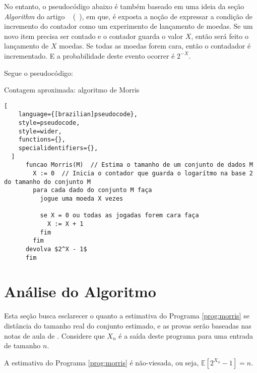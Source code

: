 No entanto, o pseudocódigo abaixo é também baseado em uma ideia da seção \textit{Algorithm} do artigo ~ (~\cite{ApproximateCountingAlgorithm}), 
em que, é exposta a noção de expressar a condição de incremento do contador como um experimento de lançamento de moedas. 
Se um novo item precisa ser contado e o contador guarda o valor $X$, então será feito o lançamento de $X$ moedas. Se todas as moedas forem cara, então o contadador é incrementado.
E a probabilidade deste evento ocorrer é $2^{-X}$. 

Segue o pseudocódigo:
\begin{programruledcaption}{Contagem aproximada: algoritmo de Morris\label{prog:morris}}
  \begin{lstlisting}[
    language={[brazilian]pseudocode},
    style=pseudocode,
    style=wider,
    functions={},
    specialidentifiers={},
  ]
      funcao Morris(M)  // Estima o tamanho de um conjunto de dados M
        X := 0  // Inicia o contador que guarda o logarítmo na base 2 do tamanho do conjunto M
        para cada dado do conjunto M faça
          jogue uma moeda X vezes

          se X = 0 ou todas as jogadas forem cara faça
            X := X + 1
          fim
        fim
      devolva $2^X - 1$
      fim
  \end{lstlisting}
\end{programruledcaption}

\section{Análise do Algoritmo}

Esta seção busca esclarecer o quanto a estimativa do Programa \ref{prog:morris} se distância do tamanho real do conjunto estimado, e as provas
serão baseadas nas notas de aula de \citep{LectureNotesAndoni}.
Considere que $X_n$ é a saída deste programa para uma entrada de tamanho $n$.

\begin{lemma}
A estimativa do Programa \ref{prog:morris} é não-viesada, ou seja, $\mathbb{E}[2^{X_n} - 1] = n$.
\end{lemma}

